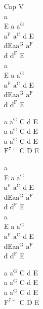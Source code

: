\begin{chord}
    Cap V\\
    a\\
    E a $\mathrm{a^G}$\\
    $\mathrm{a^F}$ $\mathrm{a^C}$ d E\\
    dEa$\mathrm{a^{G}}$ $\mathrm{a^{F}}$\\
    d $\mathrm{d^F}$ E\\
    a\\
    E a $\mathrm{a^G}$\\
    $\mathrm{a^F}$ $\mathrm{a^C}$ d E\\
    dEa$\mathrm{a^{G}}$ $\mathrm{a^{F}}$\\
    d $\mathrm{d^F}$ E

    a $\mathrm{a^G}$ C d E\\
    a $\mathrm{a^G}$ C d E\\
    a $\mathrm{a^G}$ C d E\\
    $\mathrm{F^{7+}}$ C D E

    a\\
    E a $\mathrm{a^G}$\\
    $\mathrm{a^F}$ $\mathrm{a^C}$ d E\\
    dEa$\mathrm{a^{G}}$ $\mathrm{a^{F}}$\\
    d $\mathrm{d^F}$ E\\
    a\\
    E a $\mathrm{a^G}$\\
    $\mathrm{a^F}$ $\mathrm{a^C}$ d E\\
    dEa$\mathrm{a^{G}}$ $\mathrm{a^{F}}$\\
    d $\mathrm{d^F}$ E

    a $\mathrm{a^G}$ C d E\\
    a $\mathrm{a^G}$ C d E\\
    a $\mathrm{a^G}$ C d E\\
    $\mathrm{F^{7+}}$ C D E
\end{chord}
